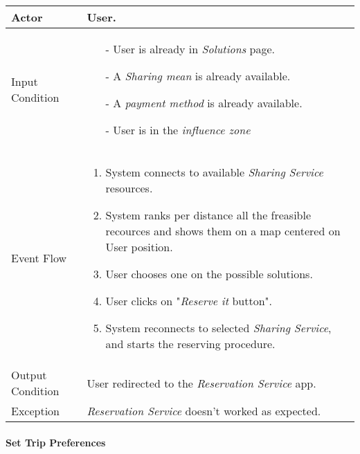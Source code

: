 		\begin{tabular}{| l | p{} | }
			\hline
			\hline
			Actor	&		User. \\
			\hline
			Input Condition		&		\begin{itemize}
													\item[-] User is already in \textit{Solutions} page.
													\item[-] A \textit{Sharing mean} is already available.
													\item[-] A \textit{payment method} is already available.
													\item[-] User is in the \textit{influence zone}
												\end{itemize} \\
			\hline
			Event Flow		&		\begin{enumerate}
												\item System connects to available \textit{Sharing Service} resources.
												\item System ranks per distance all the freasible recources and shows them on a map centered on User position.
												\item User chooses one on the possible solutions.												
												\item User clicks on "\textit{Reserve it} button".
												\item	 System reconnects to selected \textit{Sharing Service}, and starts the reserving procedure.
											\end{enumerate} \\
			\hline
			Output Condition		&		User redirected to the \textit{Reservation Service} app. \\
			\hline		
			Exception		&		\textit{Reservation Service} doesn't worked as expected. \\
			\hline
			\hline
		\end{tabular}
		
		

	\paragraph{Set Trip Preferences}
	
